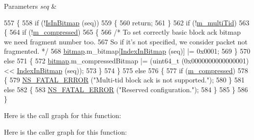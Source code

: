 \begin{DoxyParams}{Parameters}
{\em seq} & \\
\hline
\end{DoxyParams}

\begin{DoxyCode}
557 \{
558   \textcolor{keywordflow}{if} (!\hyperlink{classns3_1_1CtrlBAckResponseHeader_ab25d5b7f73ddb3c750365247ca8aa396}{IsInBitmap} (seq))
559     \{
560       \textcolor{keywordflow}{return};
561     \}
562   \textcolor{keywordflow}{if} (!\hyperlink{classns3_1_1CtrlBAckResponseHeader_ab3b2b175ee54daa240e3cc0450c5812e}{m\_multiTid})
563     \{
564       \textcolor{keywordflow}{if} (!\hyperlink{classns3_1_1CtrlBAckResponseHeader_a7d33c0c452139f1d9f110dab89bfcef7}{m\_compressed})
565         \{
566           \textcolor{comment}{/* To set correctly basic block ack bitmap we need fragment number too.}
567 \textcolor{comment}{             So if it's not specified, we consider packet not fragmented. */}
568           \hyperlink{classns3_1_1CtrlBAckResponseHeader_a08f2ce2e8665317a7d381e498cc75453}{bitmap}.m\_bitmap[\hyperlink{classns3_1_1CtrlBAckResponseHeader_aa4c749e3ad38f8b22c9488d9af5053d2}{IndexInBitmap} (seq)] |= 0x0001;
569         \}
570       \textcolor{keywordflow}{else}
571         \{
572           \hyperlink{classns3_1_1CtrlBAckResponseHeader_a08f2ce2e8665317a7d381e498cc75453}{bitmap}.m\_compressedBitmap |= (uint64\_t (0x0000000000000001) << 
      \hyperlink{classns3_1_1CtrlBAckResponseHeader_aa4c749e3ad38f8b22c9488d9af5053d2}{IndexInBitmap} (seq));
573         \}
574     \}
575   \textcolor{keywordflow}{else}
576     \{
577       \textcolor{keywordflow}{if} (\hyperlink{classns3_1_1CtrlBAckResponseHeader_a7d33c0c452139f1d9f110dab89bfcef7}{m\_compressed})
578         \{
579           \hyperlink{group__fatal_ga5131d5e3f75d7d4cbfd706ac456fdc85}{NS\_FATAL\_ERROR} (\textcolor{stringliteral}{"Multi-tid block ack is not supported."});
580         \}
581       \textcolor{keywordflow}{else}
582         \{
583           \hyperlink{group__fatal_ga5131d5e3f75d7d4cbfd706ac456fdc85}{NS\_FATAL\_ERROR} (\textcolor{stringliteral}{"Reserved configuration."});
584         \}
585     \}
586 \}
\end{DoxyCode}


Here is the call graph for this function\+:




Here is the caller graph for this function\+:



